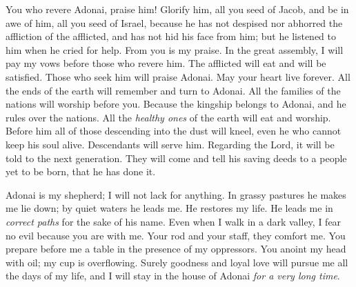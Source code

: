 \begin{biblechapter}
\verse You who revere Adonai, praise him! 
Glorify him, all you seed of Jacob, 
and be in awe of him, all you seed of Israel,
\verse because he has not despised nor abhorred the affliction of the afflicted, 
and has not hid his face from him; 
but he listened to him when he cried for help.
\verse From you is my praise. 
In the great assembly, 
I will pay my vows before those who revere him.
\verse The afflicted will eat and will be satisfied. 
Those who seek him will praise Adonai. 
May your heart live forever.
\verse All the ends of the earth 
will remember and turn to Adonai. 
All the families of the nations 
will worship before you.
\verse Because the kingship belongs to Adonai, 
and he rules over the nations.
\verse All the \textit{healthy ones} of the earth will eat and worship. 
Before him all of those descending into the dust will kneel, 
even he who cannot keep his soul alive.
\verse Descendants will serve him. 
Regarding the Lord, it will be told to the next generation.
\verse They will come and tell his saving deeds 
to a people yet to be born, that he has done it.
\end{biblechapter}

\begin{biblechapter} %
 Adonai is my shepherd; 
I will not lack for anything.
\verse In grassy pastures he makes me lie down; 
by quiet waters he leads me.
\verse He restores my life. 
He leads me in \textit{correct paths} 
for the sake of his name.
\verse Even when I walk in a dark valley, I fear no evil 
because you are with me. 
Your rod and your staff, they comfort me.
\verse You prepare before me a table 
in the presence of my oppressors. 
You anoint my head with oil; 
my cup is overflowing.
\verse Surely goodness and loyal love will pursue me 
all the days of my life, 
and I will stay in the house of Adonai 
\textit{for a very long time}.
\end{biblechapter}

